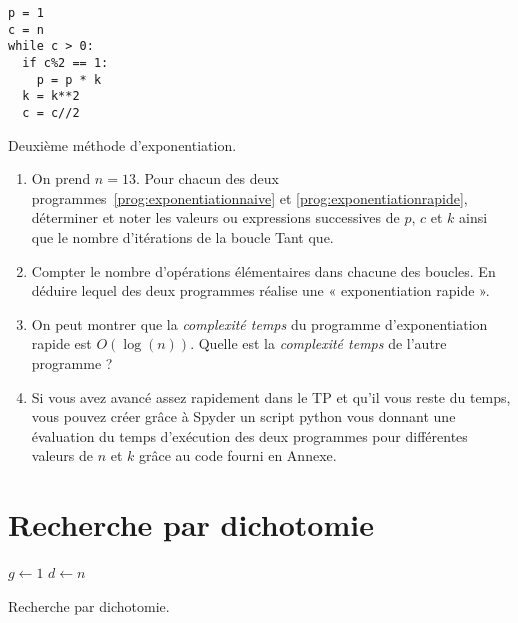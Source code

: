 \begin{listing}[!h]
\begin{verbatim}
p = 1
c = n
while c > 0:
  if c%2 == 1:
    p = p * k
  k = k**2  
  c = c//2
\end{verbatim}
\caption{Deuxième méthode d'exponentiation.}
\label{prog:exponentiationrapide}
\end{listing}

\begin{enumerate}

\item On prend $n=13$. Pour chacun des deux programmes~\ref{prog:exponentiationnaive} et \ref{prog:exponentiationrapide}, déterminer et noter les valeurs ou expressions successives de $p$, $c$ et $k$ ainsi que le nombre d'itérations de la boucle Tant que.  

\item Compter le nombre d'opérations élémentaires dans chacune des boucles. En déduire lequel des deux programmes réalise une « exponentiation rapide ». 

\item On peut montrer que la \textit{complexité temps} du programme d'exponentiation rapide est $O(\log(n))$. Quelle est la \textit{complexité temps} de l'autre programme ?

\item Si vous avez avancé assez rapidement dans le TP et qu'il vous reste du temps, vous pouvez créer grâce à Spyder un script python vous donnant une évaluation du temps d'exécution des deux programmes pour différentes valeurs de $n$ et $k$ grâce au code fourni en Annexe.

\end{enumerate}

\section{Recherche par dichotomie}

\begin{algorithm}[H]
$g \leftarrow 1$ \;
$d \leftarrow n$ \;
\caption{Recherche par dichotomie.}
\label{algo:recherchetantquedicho}
\end{algorithm}

